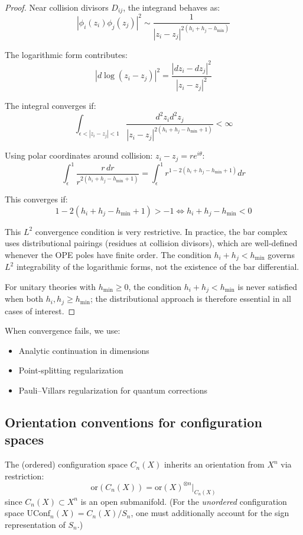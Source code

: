 \begin{proof}
Near collision divisors $D_{ij}$, the integrand behaves as:
\[|\phi_i(z_i)\phi_j(z_j)|^2 \sim \frac{1}{|z_i - z_j|^{2(h_i + h_j - h_{\min})}}\]

The logarithmic form contributes:
\[|d\log(z_i - z_j)|^2 = \frac{|dz_i - dz_j|^2}{|z_i - z_j|^2}\]

The integral converges if:
\[\int_{\epsilon < |z_i - z_j| < 1} \frac{d^2z_i d^2z_j}{|z_i - z_j|^{2(h_i + h_j - h_{\min} + 1)}} < \infty\]

Using polar coordinates around collision: $z_i - z_j = re^{i\theta}$:
\[\int_\epsilon^1 \frac{r \, dr}{r^{2(h_i + h_j - h_{\min} + 1)}} = \int_\epsilon^1 r^{1 - 2(h_i + h_j - h_{\min} + 1)} dr\]

This converges if:
\[1 - 2(h_i + h_j - h_{\min} + 1) > -1 \iff h_i + h_j - h_{\min} < 0\]

This $L^2$ convergence condition is very restrictive.  In practice, the bar complex uses distributional pairings (residues at collision divisors), which are well-defined whenever the OPE poles have finite order.  The condition $h_i + h_j < h_{\min}$ governs $L^2$ integrability of the logarithmic forms, not the existence of the bar differential.

For unitary theories with $h_{\min} \geq 0$, the condition $h_i + h_j < h_{\min}$ is never satisfied when both $h_i, h_j \geq h_{\min}$; the distributional approach is therefore essential in all cases of interest.
\end{proof}

\begin{remark}[Regularization]
When convergence fails, we use:
\begin{itemize}
\item Analytic continuation in dimensions
\item Point-splitting regularization
\item Pauli--Villars regularization for quantum corrections
\end{itemize}
\end{remark}

\subsection{Orientation conventions for configuration spaces}

\begin{definition}
The (ordered) configuration space $C_n(X)$ inherits an orientation from $X^n$ via restriction:
\[\text{or}(C_n(X)) = \text{or}(X)^{\otimes n}\big|_{C_n(X)}\]
since $C_n(X) \subset X^n$ is an open submanifold.  (For the \emph{unordered} configuration space $\mathrm{UConf}_n(X) = C_n(X)/S_n$, one must additionally account for the sign representation of $S_n$.)
\end{definition}

